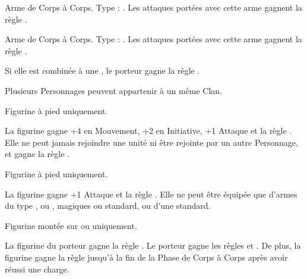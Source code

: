 \listitemonecol{\sylvanlance} Arme de Corps à Corps. Type : \lightlance{}. Les attaques portées avec cette arme gagnent la règle .

\listitemonecol{\sylvanblades} Arme de Corps à Corps. Type : \pw{}. Les attaques portées avec cette arme gagnent la règle .

\listitemonecol{\elvencloak} Si elle est combinée à une \la{}, le porteur gagne la règle .

\enditemlistonecol

\closearmyarmoury







\newpage
\begin{multicols}{2}\raggedcolumns
\toctarget{kindredstitle}{%
\vspace*{-1.5cm}\section*{}\noindent\begin{center}\hugefontsize\textbf{\antiquefont\expandafter\uppercase\expandafter{\kindreds}}\end{center}
\largefontsize
}

\spaceaftersection{}

Plusieurs Personnages peuvent appartenir à un même Clan.

\startpricelistNSP

Figurine à pied uniquement.

La figurine gagne +4 en Mouvement, +2 en Initiative, +1 Attaque et la règle . Elle ne peut jamais rejoindre une unité ni être rejointe par un autre Personnage, et gagne la règle \notaleader{}.

Figurine à pied uniquement.

La figurine gagne +1 Attaque et la règle . Elle ne peut être équipée que d'armes du type \spear{}, \gw{} ou \sylvanblades{}, magiques ou standard, ou d'une \hw{} standard.

Figurine montée sur \elvenhorse{} ou \greatelk{} uniquement.

La figurine du porteur gagne la règle \frenzy{}. Le porteur gagne les règles \devastatingcharge{} et \lighttroops{}. De plus, la figurine gagne la règle \fear{} jusqu'à la fin de la Phase de Corps à Corps après avoir réussi une charge.


\end{multicols}
